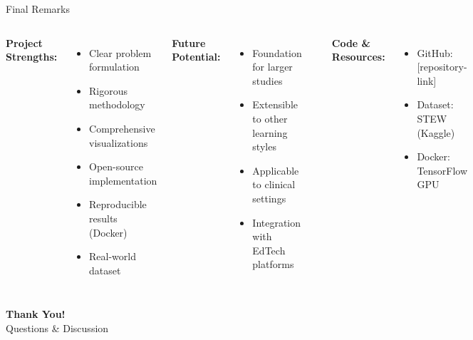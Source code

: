 \documentclass[aspectratio=169]{beamer}
\begin{document}
\begin{frame}{Final Remarks}
\begin{columns}[c]
\textbf{Project Strengths:}
\begin{itemize}
    \item Clear problem formulation
    \item Rigorous methodology
    \item Comprehensive visualizations
    \item Open-source implementation
    \item Reproducible results (Docker)
    \item Real-world dataset
\end{itemize}

\vspace{3mm}

\textbf{Future Potential:}
\begin{itemize}
    \item Foundation for larger studies
    \item Extensible to other learning styles
    \item Applicable to clinical settings
    \item Integration with EdTech platforms
\end{itemize}

\begin{center}
\end{center}

\vspace{3mm}

\textbf{Code \& Resources:}
\begin{itemize}\small
    \item GitHub: [repository-link]
    \item Dataset: STEW (Kaggle)
    \item Docker: TensorFlow GPU
\end{itemize}
\end{columns}

\vspace{3mm}

\begin{center}
\Large \textbf{Thank You!}\\[2mm]
\normalsize Questions \& Discussion
\end{center}
\end{frame}
\end{document}

